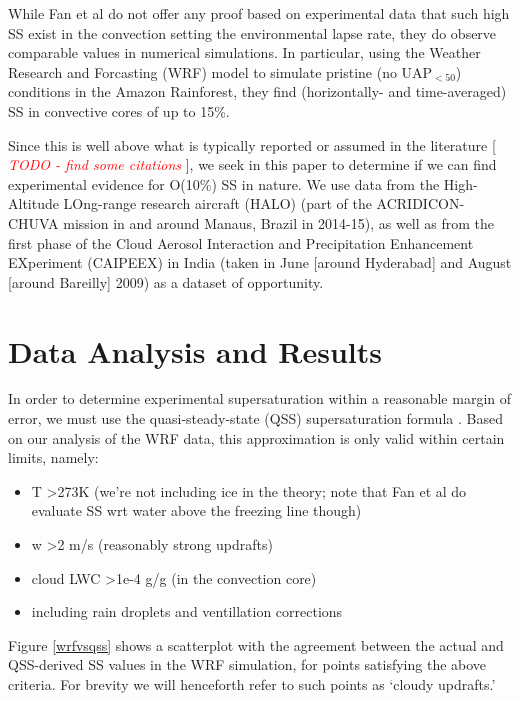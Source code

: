 \documentclass{article}
\newcommand{\klcomm}[1]{\textcolor{red}{\textit{#1}}}
\begin{document}
While Fan et al do not offer any proof based on experimental data that such high SS exist in the convection setting the environmental lapse rate, they do observe comparable values in numerical simulations. In particular, using the Weather Research and Forcasting (WRF) model to simulate pristine (no UAP$_{<50}$) conditions in the Amazon Rainforest, they find (horizontally- and time-averaged) SS in convective cores of up to 15\%.

Since this is well above what is typically reported or assumed in the literature [ \klcomm{TODO - find some citations} ], we seek in this paper to determine if we can find experimental evidence for O(10\%) SS in nature. We use data from the High-Altitude LOng-range research aircraft (HALO) (part of the ACRIDICON-CHUVA mission in and around Manaus, Brazil in 2014-15), as well as from the first phase of the Cloud Aerosol Interaction and Precipitation Enhancement EXperiment (CAIPEEX) in India (taken in June [around Hyderabad] and August [around Bareilly] 2009) \cite{???, Kulkarni2012} as a dataset of opportunity.

\section{Data Analysis and Results}

In order to determine experimental supersaturation within a reasonable margin of error, we must use the quasi-steady-state (QSS) supersaturation formula \cite{Rogers1989}. Based on our analysis of the WRF data, this approximation is only valid within certain limits, namely:
\begin{itemize}
	\item T \textgreater  273K (we're not including ice in the theory; note that Fan et al do evaluate SS wrt water above the freezing line though)
	\item w \textgreater  2 m/s (reasonably strong updrafts)
	\item cloud LWC \textgreater  1e-4 g/g (in the convection core)
	\item including rain droplets and ventillation corrections
\end{itemize}

Figure \ref{wrfvsqss} shows a scatterplot with the agreement between the actual and QSS-derived SS values in the WRF simulation, for points satisfying the above criteria. For brevity we will henceforth refer to such points as `cloudy updrafts.'

\clearpage
\newpage
\end{document}
